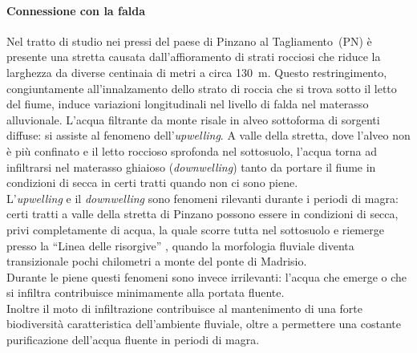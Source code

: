 \paragraph{Connessione con la falda}
Nel tratto di studio nei pressi del paese di Pinzano al Tagliamento~(PN) è presente una stretta causata dall'affioramento di strati rocciosi che riduce la larghezza da diverse centinaia di metri a circa \SI{130}{\m}.
Questo restringimento, congiuntamente all'innalzamento dello strato di roccia che si trova sotto il letto del fiume, induce variazioni longitudinali nel livello di falda nel materasso alluvionale.
L'acqua filtrante da monte risale in alveo sottoforma di sorgenti diffuse: si assiste al fenomeno dell'\emph{upwelling}.
A valle della stretta, dove l'alveo non è più confinato e il letto roccioso sprofonda nel sottosuolo, l'acqua torna ad infiltrarsi nel materasso ghiaioso (\emph{downwelling}) tanto da portare il fiume in condizioni di secca in certi tratti quando non ci sono piene.
\\
L'\emph{upwelling} e il \emph{downwelling} sono fenomeni rilevanti durante i periodi di magra: certi tratti a valle della stretta di Pinzano possono essere in condizioni di secca, privi completamente di acqua, la quale scorre tutta nel sottosuolo e riemerge presso la “Linea delle risorgive” , quando la morfologia fluviale diventa transizionale pochi chilometri a monte del ponte di Madrisio.
\\
Durante le piene questi fenomeni sono invece irrilevanti: l'acqua che emerge o che si infiltra contribuisce minimamente alla portata fluente.
\\
Inoltre il moto di infiltrazione contribuisce al mantenimento di una forte biodiversità caratteristica dell'ambiente fluviale, oltre a permettere una costante purificazione dell'acqua fluente in periodi di magra.

